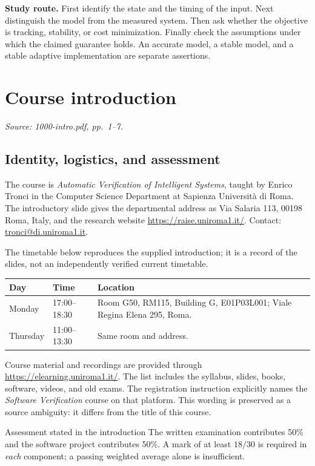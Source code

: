 \documentclass[11pt,a4paper]{article}
\numberwithin{equation}{section}
\numberwithin{figure}{section}
\numberwithin{table}{section}
\newcommand{\source}[1]{\par{\small\color{muted}\textit{Source: #1.}}\par}
\begin{document}
\textbf{Study route.} First identify the state and the timing of the input. Next distinguish the model from the measured system. Then ask whether the objective is tracking, stability, or cost minimization. Finally check the assumptions under which the claimed guarantee holds. An accurate model, a stable model, and a stable adaptive implementation are separate assertions.

\clearpage{}
\section{Course introduction}
\source{1000-intro.pdf, pp.\ 1--7}
\subsection{Identity, logistics, and assessment}
The course is \emph{Automatic Verification of Intelligent Systems}, taught by Enrico Tronci in the Computer Science Department at Sapienza Universit\`a di Roma. The introductory slide gives the departmental address as Via Salaria 113, 00198 Roma, Italy, and the research website \url{https://raise.uniroma1.it/}. Contact: \href{mailto:tronci@di.uniroma1.it}{tronci@di.uniroma1.it}.

The timetable below reproduces the supplied introduction; it is a record of the slides, not an independently verified current timetable.
\begin{center}
\begin{tabularx}{\textwidth}{@{}l l Y@{}}\toprule
Day & Time & Location\\\midrule
Monday & 17:00--18:30 & Room G50, RM115, Building G, E01P03L001; Viale Regina Elena 295, Roma.\\
Thursday & 11:00--13:30 & Same room and address.\\\bottomrule
\end{tabularx}
\end{center}
Course material and recordings are provided through \url{https://elearning.uniroma1.it/}. The list includes the syllabus, slides, books, software, videos, and old exams. The registration instruction explicitly names the \emph{Software Verification} course on that platform. This wording is preserved as a source ambiguity: it differs from the title of this course.

\begin{concept}{Assessment stated in the introduction}
The written examination contributes 50\% and the software project contributes 50\%. A mark of at least $18/30$ is required in \emph{each} component; a passing weighted average alone is insufficient.
\end{concept}
\end{document}
